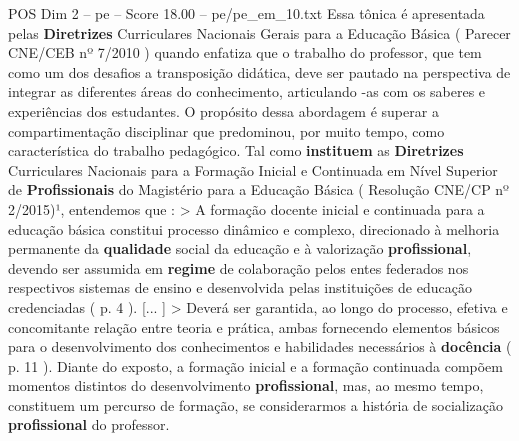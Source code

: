 \begin{textsample}{POS Dim 2 – pe – Score 18.00 – pe/pe\_em\_10.txt}
Essa tônica é apresentada pelas \textbf{Diretrizes} Curriculares Nacionais Gerais para a Educação Básica ( Parecer CNE/CEB nº 7/2010 ) quando enfatiza que o trabalho do professor, que tem como um dos desafios a transposição didática, deve ser pautado na perspectiva de integrar as diferentes áreas do conhecimento, articulando -as com os saberes e experiências dos estudantes.
O propósito dessa abordagem é superar a compartimentação disciplinar que predominou, por muito tempo, como característica do trabalho pedagógico.
Tal como \textbf{instituem} as \textbf{Diretrizes} Curriculares Nacionais para a Formação Inicial e Continuada em Nível Superior de \textbf{Profissionais} do Magistério para a Educação Básica ( Resolução CNE/CP nº 2/2015)¹, entendemos que : > A formação docente inicial e continuada para a educação básica constitui processo dinâmico e complexo, direcionado à melhoria permanente da \textbf{qualidade} social da educação e à valorização \textbf{profissional}, devendo ser assumida em \textbf{regime} de colaboração pelos entes federados nos respectivos sistemas de ensino e desenvolvida pelas instituições de educação credenciadas ( p. 4 ). [... ] > Deverá ser garantida, ao longo do processo, efetiva e concomitante relação entre teoria e prática, ambas fornecendo elementos básicos para o desenvolvimento dos conhecimentos e habilidades necessários à \textbf{docência} ( p. 11 ).
Diante do exposto, a formação inicial e a formação continuada compõem momentos distintos do desenvolvimento \textbf{profissional}, mas, ao mesmo tempo, constituem um percurso de formação, se considerarmos a história de socialização \textbf{profissional} do professor.

\end{textsample}
